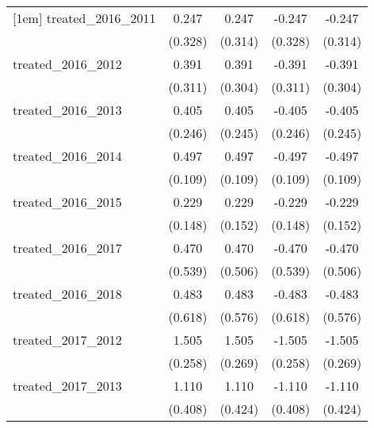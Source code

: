 {\begin{tabular}{l*{4}{c}}
[1em]
treated\_2016\_2011&       0.247         &       0.247         &      -0.247         &      -0.247         \\
            &     (0.328)         &     (0.314)         &     (0.328)         &     (0.314)         \\
[1em]
treated\_2016\_2012&       0.391         &       0.391         &      -0.391         &      -0.391         \\
            &     (0.311)         &     (0.304)         &     (0.311)         &     (0.304)         \\
[1em]
treated\_2016\_2013&       0.405         &       0.405         &      -0.405         &      -0.405         \\
            &     (0.246)         &     (0.245)         &     (0.246)         &     (0.245)         \\
[1em]
treated\_2016\_2014&       0.497\sym{***}&       0.497\sym{***}&      -0.497\sym{***}&      -0.497\sym{***}\\
            &     (0.109)         &     (0.109)         &     (0.109)         &     (0.109)         \\
[1em]
treated\_2016\_2015&       0.229         &       0.229         &      -0.229         &      -0.229         \\
            &     (0.148)         &     (0.152)         &     (0.148)         &     (0.152)         \\
[1em]
treated\_2016\_2017&       0.470         &       0.470         &      -0.470         &      -0.470         \\
            &     (0.539)         &     (0.506)         &     (0.539)         &     (0.506)         \\
[1em]
treated\_2016\_2018&       0.483         &       0.483         &      -0.483         &      -0.483         \\
            &     (0.618)         &     (0.576)         &     (0.618)         &     (0.576)         \\
[1em]
treated\_2017\_2012&       1.505\sym{***}&       1.505\sym{***}&      -1.505\sym{***}&      -1.505\sym{***}\\
            &     (0.258)         &     (0.269)         &     (0.258)         &     (0.269)         \\
[1em]
treated\_2017\_2013&       1.110\sym{**} &       1.110\sym{**} &      -1.110\sym{**} &      -1.110\sym{**} \\
            &     (0.408)         &     (0.424)         &     (0.408)         &     (0.424)         \\

\end{tabular}}
